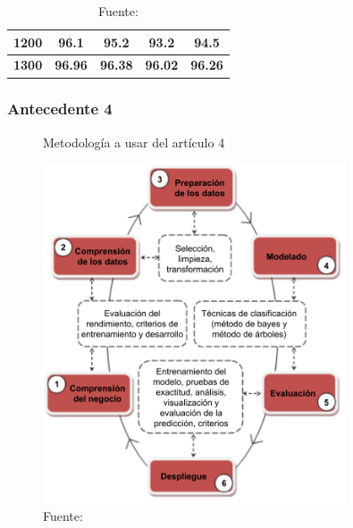 \begin{table}[H]
{\begin{tabular}{ccccc}
            \hline
            1200                                                                  & 96.1                                                            & 95.2                                                                & 93.2                                                               & 94.5                                                           \\
            \hline
            \textbf{1300}                                                         & \textbf{96.96}                                                  & \textbf{96.38}                                                      & \textbf{96.02}                                                     & \textbf{96.26}                                                 \\
            \hline
        \end{tabular}
    }
    \caption*{Fuente: \citet{StackedKNN}}
    \label{tab:Paper_3_4}
\end{table}

\subsubsection{Antecedente 4}

\lipsum[4]

\begin{figure}[H]
    \centering
    \caption{Metodología a usar del artículo 4}
    \includegraphics[width=0.8\textwidth]{E_IMAGENES/1_Capitulo2/1-research-background/Paper_4_1.pdf}
    \caption*{Fuente: \citet{arxiv2013}}
    \label{fig:Paper_4_1}
\end{figure}

